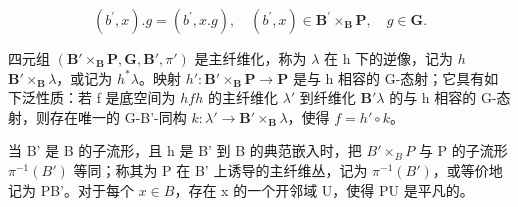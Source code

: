 \[
(b ^ {\prime}, x). g = (b ^ {\prime}, x. g), \quad (b ^ {\prime}, x) \in \mathbf {B} ^ {\prime} \times_ {\mathbf {B}} \mathbf {P}, \quad g \in \mathbf {G}.
\]

四元组 \((\mathbf{B}' \times_{\mathbf{B}} \mathbf{P}, \mathbf{G}, \mathbf{B}', \pi')\) 是主纤维化，称为 \(\lambda\) 在 h 下的逆像，记为 \(h\)\(\mathbf{B}' \times_{\mathbf{B}} \lambda\)，或记为 \(h^*\lambda\)。映射 \(h': \mathbf{B}' \times_{\mathbf{B}} \mathbf{P} \to \mathbf{P}\) 是与 h 相容的 G-态射；它具有如下泛性质：若 f 是底空间为 \(h\)\(f\)\(h\) 的主纤维化 \(\lambda'\) 到纤维化 \(\mathbf{B}'\)\(\lambda\) 的与 h 相容的 G-态射，则存在唯一的 G-B'-同构 \(k: \lambda' \to \mathbf{B}' \times_{\mathbf{B}} \lambda\)，使得 \(f = h' \circ k\)。

当 B' 是 B 的子流形，且 h 是 B' 到 B 的典范嵌入时，把 \(B' \times_{B} P\) 与 P 的子流形 \(\pi^{-1}(B')\) 等同；称其为 P 在 B' 上诱导的主纤维丛，记为 \(\pi^{-1}(B')\)，或等价地记为 P\textbar B'。对于每个 \(x \in B\)，存在 x 的一个开邻域 U，使得 P\textbar U 是平凡的。

